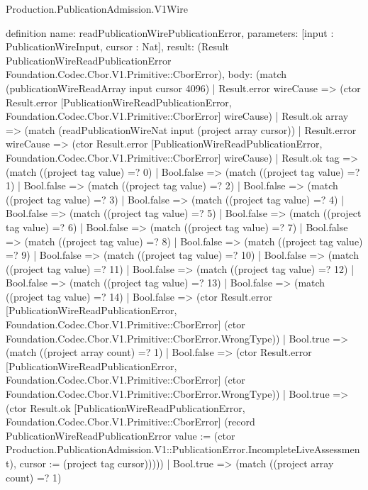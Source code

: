 \begin{lexlean}{Production.PublicationAdmission.V1Wire}
\begin{semanticmodule}
definition{
  name: readPublicationWirePublicationError,
  parameters: [input : PublicationWireInput, cursor : Nat],
  result: (Result PublicationWireReadPublicationError Foundation.Codec.Cbor.V1.Primitive::CborError),
  body: (match (publicationWireReadArray input cursor 4096)
    | Result.error wireCause => (ctor Result.error [PublicationWireReadPublicationError, Foundation.Codec.Cbor.V1.Primitive::CborError] wireCause)
    | Result.ok array => (match (readPublicationWireNat input (project array cursor))
      | Result.error wireCause => (ctor Result.error [PublicationWireReadPublicationError, Foundation.Codec.Cbor.V1.Primitive::CborError] wireCause)
      | Result.ok tag => (match ((project tag value) =? 0)
        | Bool.false => (match ((project tag value) =? 1)
          | Bool.false => (match ((project tag value) =? 2)
            | Bool.false => (match ((project tag value) =? 3)
              | Bool.false => (match ((project tag value) =? 4)
                | Bool.false => (match ((project tag value) =? 5)
                  | Bool.false => (match ((project tag value) =? 6)
                    | Bool.false => (match ((project tag value) =? 7)
                      | Bool.false => (match ((project tag value) =? 8)
                        | Bool.false => (match ((project tag value) =? 9)
                          | Bool.false => (match ((project tag value) =? 10)
                            | Bool.false => (match ((project tag value) =? 11)
                              | Bool.false => (match ((project tag value) =? 12)
                                | Bool.false => (match ((project tag value) =? 13)
                                  | Bool.false => (match ((project tag value) =? 14)
                                    | Bool.false => (ctor Result.error [PublicationWireReadPublicationError, Foundation.Codec.Cbor.V1.Primitive::CborError] (ctor Foundation.Codec.Cbor.V1.Primitive::CborError.WrongType))
                                    | Bool.true => (match ((project array count) =? 1)
                                      | Bool.false => (ctor Result.error [PublicationWireReadPublicationError, Foundation.Codec.Cbor.V1.Primitive::CborError] (ctor Foundation.Codec.Cbor.V1.Primitive::CborError.WrongType))
                                      | Bool.true => (ctor Result.ok [PublicationWireReadPublicationError, Foundation.Codec.Cbor.V1.Primitive::CborError] (record PublicationWireReadPublicationError {value := (ctor Production.PublicationAdmission.V1::PublicationError.IncompleteLiveAssessment), cursor := (project tag cursor)}))))
                                  | Bool.true => (match ((project array count) =? 1)
}
\end{semanticmodule}
\end{lexlean}
